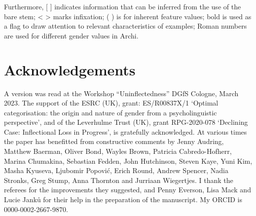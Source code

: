 \documentclass[output=paper,colorlinks,citecolor=brown]{langscibook}
\begin{document}
\medskip

Furthermore, [ ] indicates information that can be inferred from the use of the bare stem; < > marks infixation; ( ) is for inherent feature values; bold is used as a flag to draw attention to relevant characteristics of examples; Roman numbers are used for different gender values in Archi.



\section*{Acknowledgements}
A version was read at the Workshop “Uninflectedness” DGfS Cologne, March 2023. The support of the ESRC (UK), grant: ES/R00837X/1 ‘Optimal categorisation: the origin and nature of gender from a psycholinguistic perspective’, and of the Leverhulme Trust (UK), grant RPG-2020-078 ‘Declining Case: Inflectional Loss in Progress’, is gratefully acknowledged. At various times the paper has benefitted from constructive comments by Jenny Audring, Matthew Baerman, Oliver Bond, Wayles Brown, Patricia Cabredo-Hofherr, Marina Chumakina, Sebastian Fedden, John Hutchinson, Steven Kaye, Yuni Kim, Masha Kyuseva, Ljubomir Popović, Erich Round, Andrew Spencer, Nadia Stronks, Greg Stump, Anna Thornton and Jurriaan Wiegertjes. I thank the referees for the improvements they suggested, and Penny Everson, Lisa Mack and Lucie Janků for their help in the preparation of the manuscript. My ORCID is 0000-0002-2667-9870.



{\sloppy\printbibliography[heading=subbibliography,notkeyword=this]}
\end{document}
